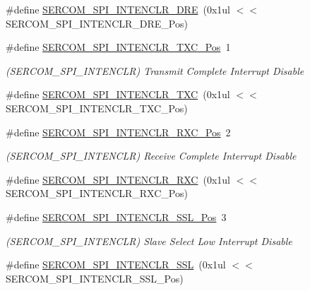 \begin{DoxyCompactItemize}
\#define \mbox{\hyperlink{group___s_a_m_d21___s_e_r_c_o_m_ga1cdf24a1a99f645bc1acb78584d03431}{S\+E\+R\+C\+O\+M\+\_\+\+S\+P\+I\+\_\+\+I\+N\+T\+E\+N\+C\+L\+R\+\_\+\+D\+RE}}~(0x1ul $<$$<$ S\+E\+R\+C\+O\+M\+\_\+\+S\+P\+I\+\_\+\+I\+N\+T\+E\+N\+C\+L\+R\+\_\+\+D\+R\+E\+\_\+\+Pos)
\item 
\#define \mbox{\hyperlink{group___s_a_m_d21___s_e_r_c_o_m_gaae47bd3f4e2b890ceb1fc0dd463b817d}{S\+E\+R\+C\+O\+M\+\_\+\+S\+P\+I\+\_\+\+I\+N\+T\+E\+N\+C\+L\+R\+\_\+\+T\+X\+C\+\_\+\+Pos}}~1
\begin{DoxyCompactList}\small\item\em (S\+E\+R\+C\+O\+M\+\_\+\+S\+P\+I\+\_\+\+I\+N\+T\+E\+N\+C\+LR) Transmit Complete Interrupt Disable \end{DoxyCompactList}\item 
\#define \mbox{\hyperlink{group___s_a_m_d21___s_e_r_c_o_m_ga38ec2463cb2950f967095bc30cf64f82}{S\+E\+R\+C\+O\+M\+\_\+\+S\+P\+I\+\_\+\+I\+N\+T\+E\+N\+C\+L\+R\+\_\+\+T\+XC}}~(0x1ul $<$$<$ S\+E\+R\+C\+O\+M\+\_\+\+S\+P\+I\+\_\+\+I\+N\+T\+E\+N\+C\+L\+R\+\_\+\+T\+X\+C\+\_\+\+Pos)
\item 
\#define \mbox{\hyperlink{group___s_a_m_d21___s_e_r_c_o_m_ga6c65bec9d88a41ae774abf77b86f79d0}{S\+E\+R\+C\+O\+M\+\_\+\+S\+P\+I\+\_\+\+I\+N\+T\+E\+N\+C\+L\+R\+\_\+\+R\+X\+C\+\_\+\+Pos}}~2
\begin{DoxyCompactList}\small\item\em (S\+E\+R\+C\+O\+M\+\_\+\+S\+P\+I\+\_\+\+I\+N\+T\+E\+N\+C\+LR) Receive Complete Interrupt Disable \end{DoxyCompactList}\item 
\#define \mbox{\hyperlink{group___s_a_m_d21___s_e_r_c_o_m_ga115ecf3e156278dfd16ca3340f18e8c8}{S\+E\+R\+C\+O\+M\+\_\+\+S\+P\+I\+\_\+\+I\+N\+T\+E\+N\+C\+L\+R\+\_\+\+R\+XC}}~(0x1ul $<$$<$ S\+E\+R\+C\+O\+M\+\_\+\+S\+P\+I\+\_\+\+I\+N\+T\+E\+N\+C\+L\+R\+\_\+\+R\+X\+C\+\_\+\+Pos)
\item 
\#define \mbox{\hyperlink{group___s_a_m_d21___s_e_r_c_o_m_gacadf12f1254b83d20ffe08850df336e0}{S\+E\+R\+C\+O\+M\+\_\+\+S\+P\+I\+\_\+\+I\+N\+T\+E\+N\+C\+L\+R\+\_\+\+S\+S\+L\+\_\+\+Pos}}~3
\begin{DoxyCompactList}\small\item\em (S\+E\+R\+C\+O\+M\+\_\+\+S\+P\+I\+\_\+\+I\+N\+T\+E\+N\+C\+LR) Slave Select Low Interrupt Disable \end{DoxyCompactList}\item 
\#define \mbox{\hyperlink{group___s_a_m_d21___s_e_r_c_o_m_ga8df0127d4553801510a330d6a6c06023}{S\+E\+R\+C\+O\+M\+\_\+\+S\+P\+I\+\_\+\+I\+N\+T\+E\+N\+C\+L\+R\+\_\+\+S\+SL}}~(0x1ul $<$$<$ S\+E\+R\+C\+O\+M\+\_\+\+S\+P\+I\+\_\+\+I\+N\+T\+E\+N\+C\+L\+R\+\_\+\+S\+S\+L\+\_\+\+Pos)

\end{DoxyCompactItemize}
